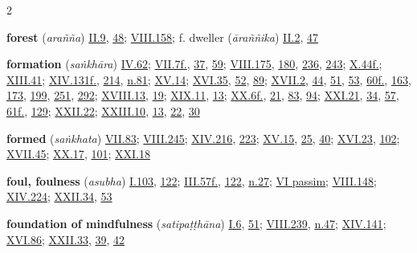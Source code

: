 \begin{multicols}{2}
\begin{vismHanging}
\par\textbf{forest} (\emph{arañña}) \hyperlink{II.9}{II.9}{}, \hyperlink{II.48}{48}{}; \hyperlink{VIII.158}{VIII.158}{}; f. dweller (\emph{āraññika}) \hyperlink{II.2}{II.2}{}, \hyperlink{II.47}{47}{}
\par\textbf{formation} (\emph{saṅkhāra}) \hyperlink{IV.62}{IV.62}{}; \hyperlink{VII.7}{VII.7f.}{}, \hyperlink{VII.37}{37}{}, \hyperlink{VII.59}{59}{}; \hyperlink{VIII.175}{VIII.175}{}, \hyperlink{VIII.180}{180}{}, \hyperlink{VIII.236}{236}{}, \hyperlink{VIII.243}{243}{}; \hyperlink{X.44}{X.44f.}{}; \hyperlink{XIII.41}{XIII.41}{}; \hyperlink{XIV.131}{XIV.131f.}{}, \hyperlink{XIV.214}{214}{}, \hyperlink{XIV.n81}{n.81}{}; \hyperlink{XV.14}{XV.14}{}; \hyperlink{XVI.35}{XVI.35}{}, \hyperlink{XVI.52}{52}{}, \hyperlink{XVI.89}{89}{}; \hyperlink{XVII.2}{XVII.2}{}, \hyperlink{XVII.44}{44}{}, \hyperlink{XVII.51}{51}{}, \hyperlink{XVII.53}{53}{}, \hyperlink{XVII.60}{60f.}{}, \hyperlink{XVII.163}{163}{}, \hyperlink{XVII.173}{173}{}, \hyperlink{XVII.199}{199}{}, \hyperlink{XVII.251}{251}{}, \hyperlink{XVII.292}{292}{}; \hyperlink{XVIII.13}{XVIII.13}{}, \hyperlink{XVIII.19}{19}{}; \hyperlink{XIX.11}{XIX.11}{}, \hyperlink{XIX.13}{13}{}; \hyperlink{XX.6}{XX.6f.}{}, \hyperlink{XX.21}{21}{}, \hyperlink{XX.83}{83}{}, \hyperlink{XX.94}{94}{}; \hyperlink{XXI.21}{XXI.21}{}, \hyperlink{XXI.34}{34}{}, \hyperlink{XXI.57}{57}{}, \hyperlink{XXI.61}{61f.}{}, \hyperlink{XXI.129}{129}{}; \hyperlink{XXII.22}{XXII.22}{}; \hyperlink{XXIII.10}{XXIII.10}{}, \hyperlink{XXIII.13}{13}{}, \hyperlink{XXIII.22}{22}{}, \hyperlink{XXIII.30}{30}{}
\par\textbf{formed} (\emph{saṅkhata}) \hyperlink{VII.83}{VII.83}{}; \hyperlink{VIII.245}{VIII.245}{}; \hyperlink{XIV.216}{XIV.216}{}, \hyperlink{XIV.223}{223}{}; \hyperlink{XV.15}{XV.15}{}, \hyperlink{XV.25}{25}{}, \hyperlink{XV.40}{40}{}; \hyperlink{XVI.23}{XVI.23}{}, \hyperlink{XVI.102}{102}{}; \hyperlink{XVII.45}{XVII.45}{}; \hyperlink{XX.17}{XX.17}{}, \hyperlink{XX.101}{101}{}; \hyperlink{XXI.18}{XXI.18}{}
\par\textbf{foul, foulness} (\emph{asubha}) \hyperlink{I.103}{I.103}{}, \hyperlink{I.122}{122}{}; \hyperlink{III.57}{III.57f.}{}, \hyperlink{III.122}{122}{}, \hyperlink{III.n27}{n.27}{}; \hyperlink{VI}{VI passim}{}; \hyperlink{VIII.148}{VIII.148}{}; \hyperlink{XIV.224}{XIV.224}{}; \hyperlink{XXII.34}{XXII.34}{}, \hyperlink{XXII.53}{53}{}
\par\textbf{foundation of mindfulness} (\emph{satipaṭṭhāna}) \hyperlink{I.6}{I.6}{}, \hyperlink{I.51}{51}{}; \hyperlink{VIII.239}{VIII.239}{}, \hyperlink{VIII.n47}{n.47}{}; \hyperlink{XIV.141}{XIV.141}{}; \hyperlink{XVI.86}{XVI.86}{}; \hyperlink{XXII.33}{XXII.33}{}, \hyperlink{XXII.39}{39}{}, \hyperlink{XXII.42}{42}{}

\end{vismHanging}
\end{multicols}
